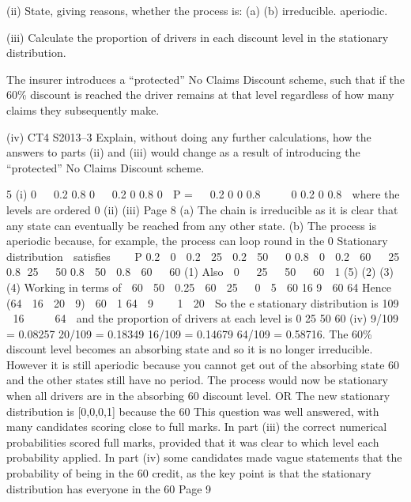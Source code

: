 \documentclass[a4paper,12pt]{article}
\begin{document}
\begin{enumerate}
(ii) State, giving reasons, whether the process is:
(a)
(b)
irreducible.
aperiodic.

(iii)
Calculate the proportion of drivers in each discount level in the stationary distribution.

The insurer introduces a “protected” No Claims Discount scheme, such that if the 60\% discount is reached the driver remains at that level regardless of how many
claims they subsequently make.

(iv)
CT4 S2013–3
Explain, without doing any further calculations, how the answers to parts (ii)
and (iii) would change as a result of introducing the “protected” No Claims
Discount scheme.

5
(i)
0 
 0.2 0.8 0


0.2 0 0.8 0 
P = 
 0.2 0
0 0.8 


 0 0.2 0 0.8 
where the levels are ordered 0%
(ii)
(iii)
Page 8
(a) The chain is irreducible as it is clear that any state can eventually be reached
from any other state.
(b) The process is aperiodic because, for example, the process can loop round in
the 0%
Stationary distribution  satisfies    P
0.2  0  0.2  25  0.2  50   0
0.8  0  0.2  60   25
0.8 25   50
0.8  50  0.8  60   60 (1)
Also  0   25   50   60  1 (5)
(2)
(3)
(4)%
Working in terms of  60
 50  0.25  60
 25 
 0 
5
 60
16
9
 60
64
Hence
(64  16  20  9)
 60  1
64
 9 
 
1  20 
So the e stationary distribution is
109  16 
 
 64 
and the proportion of drivers at each level is
0%
25%
50%
60%
(iv)
9/109 = 0.08257
20/109 = 0.18349
16/109 = 0.14679
64/109 = 0.58716.
The 60\% discount level becomes an absorbing state and so it is no longer irreducible.
However it is still aperiodic because you cannot get out of the absorbing state 60%
and the other states still have no period.
The process would now be stationary when all drivers are in the absorbing 60%
discount level.
OR
The new stationary distribution is [0,0,0,1] because the 60%
This question was well answered, with many candidates scoring close to full marks. In part
(iii) the correct numerical probabilities scored full marks, provided that it was clear to which
level each probability applied. In part (iv) some candidates made vague statements that the
probability of being in the 60%
credit, as the key point is that the stationary distribution has everyone in the 60%
Page 9%



\end{enumerate}
\end{document}
